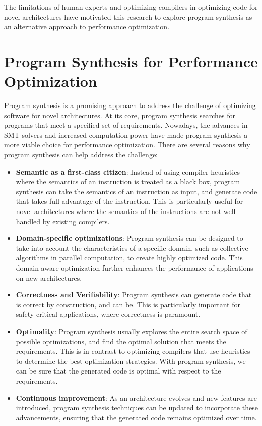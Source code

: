 The limitations of human experts and optimizing compilers in
optimizing code for novel architectures have motivated this research
to explore program synthesis as an alternative approach to
performance optimization.

\section{Program Synthesis for Performance Optimization}

Program synthesis is a promising approach to address the challenge of
optimizing software for novel architectures.
%
At its core, program synthesis searches for programs that meet a
specified set of requirements.
%
Nowadays, the advances in SMT solvers and increased computation power
have made program synthesis a more viable choice for performance optimization.
%
There are several reasons why program synthesis can help address the
challenge:

\begin{itemize}
    \item \textbf{Semantic as a first-class citizen}: Instead of using
    compiler heuristics where the semantics of an instruction is treated
    as a black box, program synthesis can take the semantics of an
    instruction as input, and generate code that takes full advantage
    of the instruction. This is particularly useful for novel
    architectures where the semantics of the instructions are not well
    handled by existing compilers.

    \item \textbf{Domain-specific optimizations}: Program synthesis
    can be designed to take into account the characteristics of a
    specific domain, such as collective algorithms in parallel
    computation, to create highly optimized code.
    This domain-aware optimization further enhances the performance of
    applications on new architectures.

    \item \textbf{Correctness and Verifiability}: Program synthesis
    can generate code that is correct by construction, and can be.
    This is particularly important for safety-critical applications,
    where correctness is paramount.

    \item \textbf{Optimality}: Program synthesis usually explores the
    entire search space of possible optimizations, and find the
    optimal solution that meets the requirements. This is in contrast
    to optimizing compilers that use heuristics to determine the best
    optimization strategies. With program synthesis, we can be sure
    that the generated code is optimal with respect to the
    requirements.

    \item \textbf{Continuous improvement}: As an architecture evolves
    and new features are introduced, program synthesis techniques can
    be updated to incorporate these advancements, ensuring that the
    generated code remains optimized over time.
\end{itemize}

